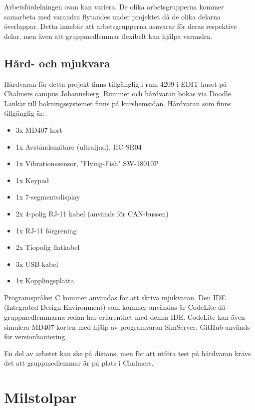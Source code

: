 \documentclass[a4paper]{article}
\begin{document}
Arbetsfördelningen ovan kan variera. De olika arbetsgrupperna kommer samarbeta med varandra flytandes under projektet då de olika delarna överlappar. Detta innebär att arbetsgrupperna asnvarar för deras respektive delar, men även att gruppmedlemmar flexibelt kan hjälpa varandra. 

\subsection{Hård- och mjukvara}

Hårdvaran för detta projekt finns tillgänglig i rum 4209 i EDIT-huset på Chalmers campus Johanneberg. Rummet och hårdvaran bokas via Doodle. Länkar till bokningssystemet finns på kurshemsidan. Hårdvaran som finns tillgänglig är:

\begin{itemize}
    \item 3x MD407 kort
    \item 1x Avståndsmätare (ultraljud), HC-SR04
    \item 1x Vibrationssensor, "Flying-Fish" SW-18010P
    \item 1x Keypad
    \item 1x 7-segmentsdisplay
    \item 2x 4-polig RJ-11 kabel (används för CAN-bussen)
    \item 1x RJ-11 förgrening
    \item 2x Tiopolig flatkabel
    \item 3x USB-kabel
    \item 1x Kopplingsplatta
\end{itemize}

Programspråket C kommer användas för att skriva mjukvaran. Den IDE (Integrated Design Environment) som kommer användas är CodeLite då gruppmedlemmarna redan har erfarenthet med denna IDE. CodeLite kan även simulera MD407-korten med hjälp av programvaran SimServer. GitHub används för versionhantering.

En del av arbetet kan ske på distans, men för att utföra test på hårdvaran krävs det att gruppmedlemmar är på plats i Chalmers.

\section{Milstolpar}
\end{document}
